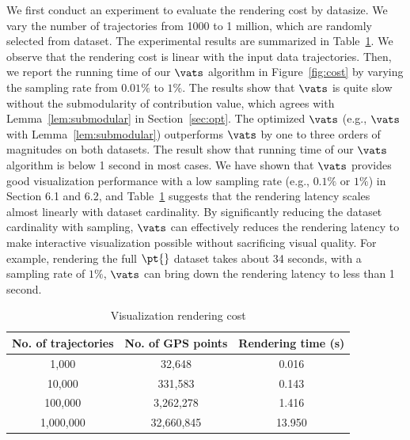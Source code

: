 We first conduct an experiment to evaluate the rendering cost by datasize. We vary the number of trajectories from 1000 to 1 million, which are randomly selected from \pt{} dataset. The experimental results are summarized in Table~\ref{tab:gpu}. We observe that the rendering cost is linear with the input data trajectories.
Then, we report the running time of our $\vats$ algorithm in Figure~\ref{fig:cost} by varying the sampling rate from $0.01\%$ to $1\%$. The results show that $\vats$ is quite slow without the submodularity of contribution value, which agrees with Lemma~\ref{lem:submodular} in Section~\ref{sec:opt}.
The optimized $\vats$ (e.g., $\vats$ with Lemma~\ref{lem:submodular}) outperforms $\vats$ by one to three orders of magnitudes on both datasets. The result show that running time of our $\vats$ algorithm is below 1 second in most cases. We have shown that $\vats$ provides good visualization performance with a low sampling rate (e.g., $0.1\%$ or $1\%$) in Section 6.1 and 6.2,  and Table~\ref{tab:gpu} suggests that the rendering latency scales almost linearly with dataset cardinality. By significantly reducing the dataset cardinality with sampling, $\vats$ can effectively reduces the rendering latency to make interactive visualization possible without sacrificing visual quality. For example, rendering the full $\pt{}$ dataset takes about 34 seconds, with a sampling rate of $1\%$, $\vats$ can bring down the rendering latency to less than 1 second.

\begin{table}
	\centering
	\small
	\caption{Visualization rendering cost}
	\begin{tabular}{|c|c|c|} \hline
		No. of trajectories & No. of GPS points & Rendering time (s) \\ \hline
		1,000& 32,648 & 0.016\\ \hline
		10,000& 331,583 & 0.143\\ \hline
		100,000& 3,262,278 & 1.416\\ \hline
		1,000,000& 32,660,845 & 13.950\\ \hline
	\end{tabular}	\label{tab:gpu}
\end{table}
